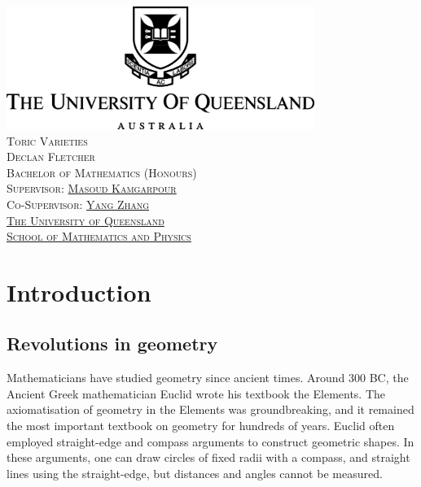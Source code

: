\documentclass[12pt]{amsart}
\theoremstyle{plain}
\begin{document}

\begin{center}
\includegraphics[width=10cm]{../images/UQLogo.jpg} \\ 
\vspace{3cm}
{\LARGE\textsc{Toric Varieties}} \\
\vspace{0.5cm}
{\textsc{Declan Fletcher}} \\
\vspace{8cm}
{\textsc{ Bachelor of Mathematics (Honours)}} \\
\vspace{1cm}
{\textsc{Supervisor: \href{https://sites.google.com/site/masoudkomi/home}{Masoud Kamgarpour}}} \\
{\textsc{Co-Supervisor: \href{https://sites.google.com/site/yangzhang139/home}{Yang Zhang}}} \\
\vspace{1cm}
{\textsc{\href{https://www.uq.edu.au/}{The University of Queensland}}} \\
{\textsc{\href{https://smp.uq.edu.au/}{School of Mathematics and Physics}}}
\end{center}

\newpage
\tableofcontents

\newpage
{}
\section*{Introduction}\label{chapter:introduction}
\subsection*{Revolutions in geometry}
Mathematicians have studied geometry since ancient times.
Around 300 BC, the Ancient Greek mathematician Euclid wrote his textbook the Elements.
The axiomatisation of geometry in the Elements was groundbreaking, and it remained the most important textbook on geometry for hundreds of years.
Euclid often employed straight-edge and compass arguments to construct geometric shapes.
In these arguments, one can draw circles of fixed radii with a compass, and straight lines using the straight-edge, but distances and angles cannot be measured.
\end{document}
